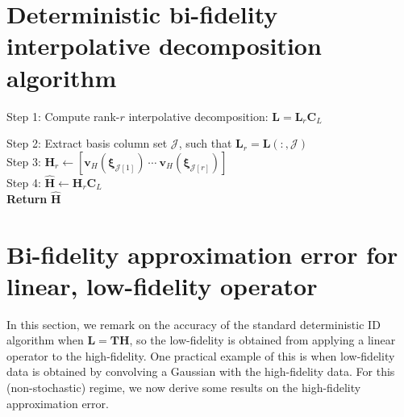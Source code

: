 \documentclass[preprint,10pt]{elsarticle}
\begin{document}
\section{Deterministic bi-fidelity interpolative decomposition algorithm}
\label{app:deterministicid}

\begin{algorithm}[h]
\caption{Bi-fidelity interpolative decomposition for deterministic data.}
\label{alg:deterministicid}
\hrulefill



\hrulefill

\BlankLine
Step 1: Compute rank-$r$ interpolative decomposition: $\bm{L} = \bm{L}_r \bm{C}_L$

\BlankLine
Step 2: Extract basis column set $\mathcal{J}$, such that $\bm{L}_r = \bm{L}(:, \mathcal{J})$ \\

\BlankLine
Step 3: $\bm H_r \gets \left[ \boldsymbol v_H(\boldsymbol \xi_{\mathcal{J}[1]}) \ \cdots \ \boldsymbol v_H(\boldsymbol \xi_{\mathcal{J}[r]})  \right] $ \\

\BlankLine
Step 4: $\widehat{\bm H} \gets \bm H_r \bm{C}_L$ \\

\BlankLine
\textbf{Return} $\widehat{\bm H}$

\hrulefill
\end{algorithm}

\section{Bi-fidelity approximation error for linear, low-fidelity operator}
\label{app:linearop}

In this section, we remark on the accuracy of the standard deterministic ID algorithm when $\bm{L} = \bm{T}\bm{H}$, so the low-fidelity is obtained from applying a linear operator to the high-fidelity. One practical example of this is when low-fidelity data is obtained by convolving a Gaussian with the high-fidelity data. For this (non-stochastic) regime, we now derive some results on the high-fidelity approximation error.
\end{document}
